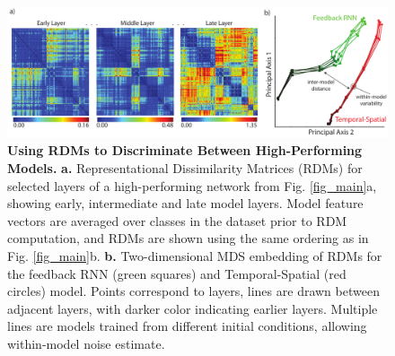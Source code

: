 \begin{figure}
\FigCenter
\includegraphics [width=\DefaultFigSize\linewidth]{figures/rdms.pdf}
\vspace{-5mm}
\caption{\footnotesize{\textbf{Using RDMs to Discriminate Between High-Performing Models.} \textbf{a.} Representational Dissimilarity Matrices (RDMs) for selected layers of a high-performing network from Fig. \ref{fig_main}a, showing early, intermediate and late model layers.  Model feature vectors are averaged over classes in the dataset prior to RDM computation, and RDMs are shown using the same ordering as in Fig. \ref{fig_main}b. \textbf{b.} Two-dimensional MDS embedding of RDMs for the feedback RNN (green squares) and Temporal-Spatial (red circles) model.  Points correspond to layers, lines are drawn between adjacent layers, with darker color indicating earlier layers.  Multiple lines are models trained from different initial conditions, allowing within-model noise estimate.}~\label{fig_rdms}}
\vspace{-5mm}
\end{figure}


